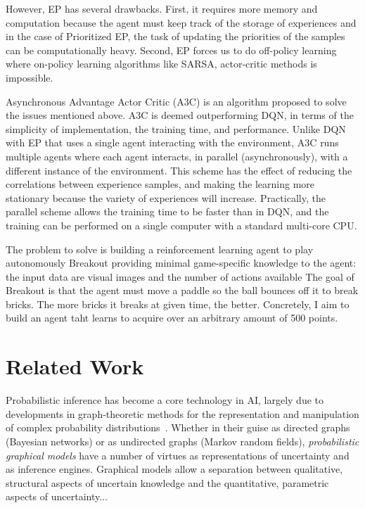 \documentclass[twoside,11pt]{article}
\begin{document}
However, EP has several drawbacks. First, it requires more memory and computation because the agent must keep track of the storage of experiences and in the case of Prioritized EP, the task of updating the priorities of the samples can be computationally heavy. Second, EP forces us to do off-policy learning where on-policy learning algorithms like SARSA, actor-critic methods is impossible.

Asynchronous Advantage Actor Critic (A3C) is an algorithm proposed to solve the issues mentioned above. A3C is deemed outperforming DQN, in terms of the simplicity of implementation, the training time, and performance. Unlike DQN with EP that uses a single agent interacting with the environment, A3C runs multiple agents where each agent interacts, in parallel (asynchronously), with a different instance of the environment. This scheme has the effect of reducing the correlations between experience samples, and making the learning more stationary because the variety of experiences will increase. Practically, the parallel scheme allows the training time to be faster than in DQN, and the training can be performed on a single computer with a standard multi-core CPU.

The problem to solve is building a reinforcement learning agent to play autonomously Breakout providing minimal game-specific knowledge to the agent: the input data are visual images and the number of actions available The goal of Breakout is that the agent must move a paddle so the ball bounces off it to break bricks. The more bricks it breaks at given time, the better. Concretely, I aim to build an agent taht learns to acquire over an arbitrary amount of 500 points.


\section{Related Work}

Probabilistic inference has become a core technology in AI,
largely due to developments in graph-theoretic methods for the 
representation and manipulation of complex probability 
distributions~\citep{pearl:88}.  Whether in their guise as 
directed graphs (Bayesian networks) or as undirected graphs (Markov 
random fields), \emph{probabilistic graphical models} have a number 
of virtues as representations of uncertainty and as inference engines.  
Graphical models allow a separation between qualitative, structural
aspects of uncertain knowledge and the quantitative, parametric aspects 
of uncertainty...\\
\end{document}
